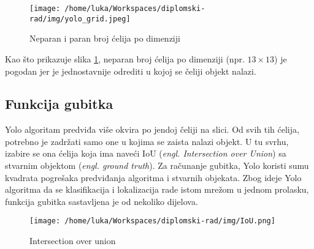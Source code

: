 \begin{figure}[htp]
	\centering
	\texttt{[image: /home/luka/Workspaces/diplomski-rad/img/yolo\_grid.jpeg]}
	\caption{Neparan i paran broj ćelija po dimenziji}
	\label{img:yolo-grid}
\end{figure}

Kao što prikazuje slika \ref{img:yolo-grid}, neparan broj ćelija po dimenziji (npr. $13\times13$) je pogodan jer je jednostavnije odrediti u kojoj se čeliji objekt nalazi.

\subsection{Funkcija gubitka}

Yolo algoritam predviđa više okvira po jendoj čeliji na slici. Od svih tih ćelija, potrebno je zadržati samo one u kojima se zaista nalazi objekt. U tu svrhu, izabire se ona ćelija koja ima naveći IoU (\textit{engl. Intersection over Union}) sa stvarnim objektom (\textit{engl. ground truth}). Za računanje gubitka, Yolo koristi sumu kvadrata pogrešaka predviđanja algoritma i stvarnih objekata. Zbog ideje Yolo algoritma da se klasifikacija i lokalizacija rade istom mrežom u jednom prolasku, funkcija gubitka sastavljena je od nekoliko dijelova.

\begin{figure}[htp]
	\centering
	\texttt{[image: /home/luka/Workspaces/diplomski-rad/img/IoU.png]}
	\caption{Intersection over union}
	\label{img:IoU}
\end{figure}

